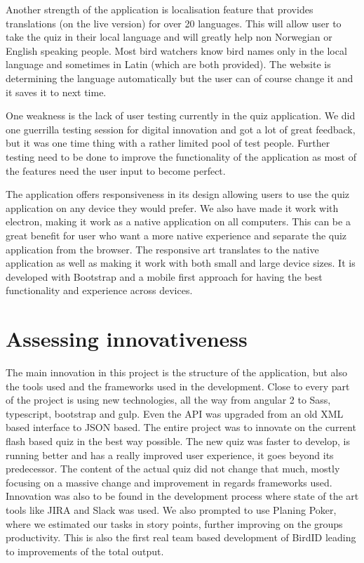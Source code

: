 Another strength of the application is localisation feature that provides translations (on the live version) for over 20 languages. This will allow user to take the quiz in their local language and will greatly help non Norwegian or English speaking people. Most bird watchers know bird names only in the local language and sometimes in Latin (which are both provided). The website is determining the language automatically but the user can of course change it and it saves it to next time.

One weakness is the lack of user testing currently in the quiz application. We did one guerrilla testing session for digital innovation and got a lot of great feedback, but it was one time thing with a rather limited pool of test people. Further testing need to be done to improve the functionality of the application as most of the features need the user input to become perfect. 


The application offers responsiveness in its design allowing users to use the quiz application on any device they would prefer. We also have made it work with electron, making it work as a native application on all computers. This can be a great benefit for user who want a more native experience and separate the quiz application from the browser. The responsive art translates to the native application as well as making it work with both small and large device sizes. It is developed with Bootstrap and a mobile first approach for having the best functionality and experience across devices.

 
 \section{Assessing innovativeness}
 
The main innovation in this project is the structure of the application, but also the tools used and the frameworks used in the development. Close to every part of the project is using new technologies, all the way from angular 2 to Sass, typescript, bootstrap and gulp. Even the API was upgraded from an old XML based interface to JSON based. The entire project was to innovate on the current flash based quiz in the best way possible. The new quiz was faster to develop, is running better and has a really improved user experience, it goes beyond its predecessor. The content of the actual quiz did not change that much, mostly focusing on a massive change and improvement in regards frameworks used. Innovation was also to be found in the development process where state of the art tools like JIRA and Slack was used. We also prompted to use Planing Poker, where we estimated our tasks in story points, further improving on the groups productivity. This is also the first real team  based development of BirdID leading to improvements of the total output.

